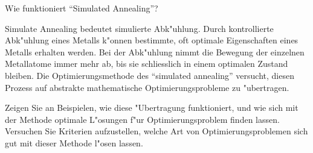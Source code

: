 \begin{aufgabe}
Wie funktioniert ``Simulated Annealing''?
\end{aufgabe}

{\parindent 0pt Simulate Annealing} bedeutet simulierte Abk"uhlung.
Durch kontrollierte
Abk"uhlung eines Metalls k"onnen bestimmte, oft optimale Eigenschaften
eines Metalls erhalten werden. Bei der Abk"uhlung nimmt die Bewegung 
der einzelnen Metallatome immer mehr ab, bis sie schliesslich in einem
optimalen Zustand bleiben. Die Optimierungsmethode des ``simulated
annealing'' versucht, diesen Prozess auf abstrakte mathematische
Optimierungsprobleme zu "ubertragen.

Zeigen Sie an Beispielen, wie diese "Ubertragung funktioniert, und
wie sich mit der Methode optimale L"osungen f"ur Optimierungsproblem
finden lassen. Versuchen Sie Kriterien aufzustellen, welche Art von
Optimierungsproblemen sich gut mit dieser Methode l"osen lassen.
